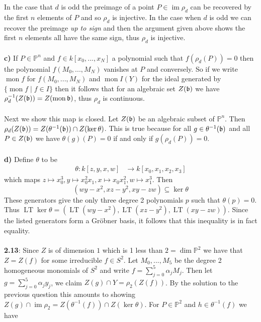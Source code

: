 \documentclass[12pt]{article}
\numberwithin{thm}{subsection}
\numberwithin{defn}{subsection}
\numberwithin{lemma}{subsection}
\numberwithin{example}{subsection}
\numberwithin{notation}{subsection}
\numberwithin{cor}{subsection}
\numberwithin{remark}{subsection}
\numberwithin{condition}{subsection}
\numberwithin{question}{subsection}
\numberwithin{construction}{subsection}
\numberwithin{construction}{subsection}
\numberwithin{construction}{subsection}
\newcommand{\bb}[1]{\mathbb{#1}}
\newcommand{\lto}{\longrightarrow}
\newcommand{\im}{\operatorname{im}}
\begin{document}
In the case that $d$ is odd the preimage of a point $P \in \im \rho_d$ can be recovered by the first $n$ elements of $P$ and so $\rho_d$ is injective. In the case when $d$ is odd we can recover the preimage \emph{up to sign} and then the argument given above shows the first $n$ elements all have the same sign, thus $\rho_d$ is injective.\\\\
%
\textbf{c)} 
%
If $P \in \bb{P}^n$ and $f \in k[x_0,...,x_N]$ a polynomial such that $f(\rho_d(P)) = 0$ then the polynomial $f(M_0,...,M_N)$ vanishes at $P$ and conversely. So if we write $\operatorname{mon}f$ for $f(M_0,...,M_N)$ and $\operatorname{mon}I(Y)$ for the ideal generated by $\lbrace \operatorname{mon}f \mid f \in I \rbrace$ then it follows that for an algebraic set $Z(\frak{b})$ we have $\rho_d^{-1}(Z(\frak{b})) = Z(\operatorname{mon}\frak{b})$, thus $\rho_d$ is continuous.\\\\
%
Next we show this map is closed. Let $Z(\frak{b})$ be an algebraic subset of $\bb{P}^n$. Then $\rho_d(Z(\frak{b})) = Z(\theta^{-1}(\frak{b})) \cap Z(\ker \theta)$. This is true because for all $g \in \theta^{-1}(\frak{b})$ and all $P \in Z(\frak{b})$ we have $\theta(g)(P) = 0$ if and only if $g(\rho_d(P)) = 0$.\\\\
%
\textbf{d)} Define $\theta$ to be
\begin{align*}
\theta: k[z, y, x, w] &\lto k[x_0, x_1, x_2, x_3]
\end{align*}
which maps $z \longmapsto x_0^3, y \longmapsto x_0^2x_1, x \longmapsto x_0x_1^2, w \longmapsto x_1^3$. Then
\begin{equation}
(wy - x^2, xz - y^2, xy - zw) \subseteq \ker\theta
\end{equation}
These generators give the only three degree 2 polynomials $p$ such that $\theta(p) = 0$. Thus $\operatorname{LT}\ker\theta = (\operatorname{LT}(wy - x^2), \operatorname{LT}(xz - y^2), \operatorname{LT}(xy - zw))$. Since the listed generators form a Gr\"{o}bner basis, it follows that this inequality is in fact equality.\\\\
%
\textbf{2.13}: Since $Z$ is of dimension $1$ which is 1 less than $2 = \operatorname{dim}\bb{P}^2$ we have that $Z = Z(f)$ for some irreducible $f \in S^2$. Let $M_0,...,M_5$ be the degree 2 homogeneous monomials of $S^2$ and write $f = \sum_{j = 0}^5 \alpha_j M_j$. Then let $g = \sum_{j=0}^5\alpha_j y_j$, we claim $Z(g) \cap Y = \rho_2(Z(f))$. By the solution to the previous question this amounts to showing $Z(g) \cap \operatorname{im}\rho_2 = Z(\theta^{-1}(f)) \cap Z(\ker\theta)$. For $P \in \bb{P}^2$ and $h \in \theta^{-1}(f)$ we have
\end{document}
